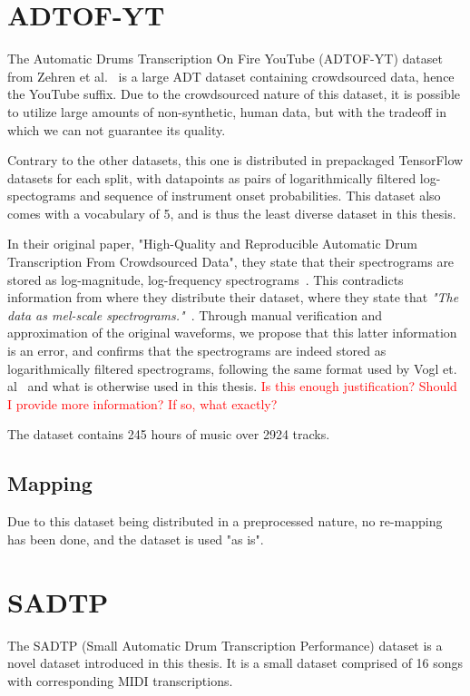 \section{ADTOF-YT}

The Automatic Drums Transcription On Fire YouTube (ADTOF-YT) dataset from Zehren et al.~\cite{signals4040042} is a large \gls{ADT} dataset containing crowdsourced data, hence the YouTube suffix. Due to the crowdsourced nature of this dataset, it is possible to utilize large amounts of non-synthetic, human data, but with the tradeoff in which we can not guarantee its quality.

Contrary to the other datasets, this one is distributed in prepackaged TensorFlow datasets for each split, with datapoints as pairs of logarithmically filtered log-spectograms and sequence of instrument onset probabilities. This dataset also comes with a vocabulary of 5, and is thus the least diverse dataset in this thesis.

In their original paper, "High-Quality and Reproducible Automatic Drum Transcription From Crowdsourced Data", they state that their spectrograms are stored as log-magnitude, log-frequency spectrograms~\cite{signals4040042}. This contradicts information from where they distribute their dataset, where they state that \textit{"The data as mel-scale spectrograms."}~\cite{zehren_2023_10084511}. Through manual verification and approximation of the original waveforms, we propose that this latter information is an error, and confirms that the spectrograms are indeed stored as logarithmically filtered spectrograms, following the same format used by Vogl et. al~\cite{Vogl2017DrumTV} and what is otherwise used in this thesis.
\textcolor{red}{Is this enough justification? Should I provide more information? If so, what exactly?}

The dataset contains 245 hours of music over 2924 tracks.

\subsection{Mapping}

Due to this dataset being distributed in a preprocessed nature, no re-mapping has been done, and the dataset is used "as is".

\section{SADTP}

The SADTP (Small Automatic Drum Transcription Performance) dataset is a novel dataset introduced in this thesis. It is a small dataset comprised of 16 songs with corresponding MIDI transcriptions. 

